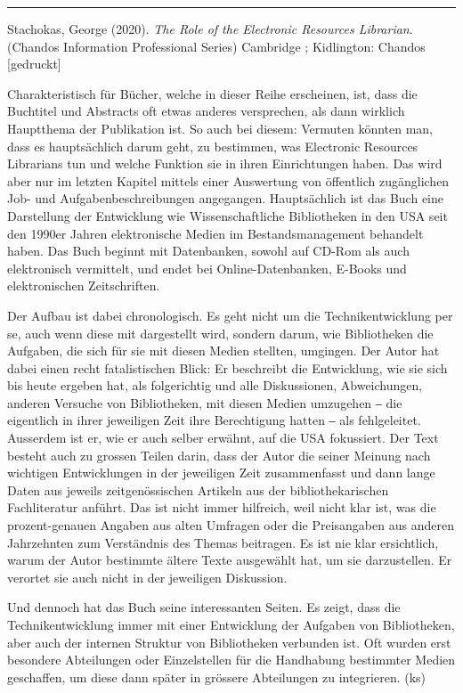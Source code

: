 \documentclass[a4paper,
fontsize=11pt,
oneside,
numbers=noperiodatend,
parskip=half-,
bibliography=totoc,
final
]{scrartcl}
\begin{document}
\begin{center}\rule{0.5\linewidth}{0.5pt}\end{center}

Stachokas, George (2020). \emph{The Role of the Electronic Resources
Librarian}. (Chandos Information Professional Series) Cambridge ;
Kidlington: Chandos {[}gedruckt{]}

Charakteristisch für Bücher, welche in dieser Reihe erscheinen, ist,
dass die Buchtitel und Abstracts oft etwas anderes versprechen, als dann
wirklich Hauptthema der Publikation ist. So auch bei diesem: Vermuten
könnten man, dass es hauptsächlich darum geht, zu bestimmen, was
Electronic Resources Librarians tun und welche Funktion sie in ihren
Einrichtungen haben. Das wird aber nur im letzten Kapitel mittels einer
Auswertung von öffentlich zugänglichen Job- und Aufgabenbeschreibungen
angegangen. Hauptsächlich ist das Buch eine Darstellung der Entwicklung
wie Wissenschaftliche Bibliotheken in den USA seit den 1990er Jahren
elektronische Medien im Bestandsmanagement behandelt haben. Das Buch
beginnt mit Datenbanken, sowohl auf CD-Rom als auch elektronisch
vermittelt, und endet bei Online-Datenbanken, E-Books und elektronischen
Zeitschriften.

Der Aufbau ist dabei chronologisch. Es geht nicht um die
Technikentwicklung per se, auch wenn diese mit dargestellt wird, sondern
darum, wie Bibliotheken die Aufgaben, die sich für sie mit diesen Medien
stellten, umgingen. Der Autor hat dabei einen recht fatalistischen
Blick: Er beschreibt die Entwicklung, wie sie sich bis heute ergeben
hat, als folgerichtig und alle Diskussionen, Abweichungen, anderen
Versuche von Bibliotheken, mit diesen Medien umzugehen ‒ die eigentlich
in ihrer jeweiligen Zeit ihre Berechtigung hatten ‒ als fehlgeleitet.
Ausserdem ist er, wie er auch selber erwähnt, auf die USA fokussiert.
Der Text besteht auch zu grossen Teilen darin, dass der Autor die seiner
Meinung nach wichtigen Entwicklungen in der jeweiligen Zeit
zusammenfasst und dann lange Daten aus jeweils zeitgenössischen Artikeln
aus der bibliothekarischen Fachliteratur anführt. Das ist nicht immer
hilfreich, weil nicht klar ist, was die prozent-genauen Angaben aus
alten Umfragen oder die Preisangaben aus anderen Jahrzehnten zum
Verständnis des Themas beitragen. Es ist nie klar ersichtlich, warum der
Autor bestimmte ältere Texte ausgewählt hat, um sie darzustellen. Er
verortet sie auch nicht in der jeweiligen Diskussion.

Und dennoch hat das Buch seine interessanten Seiten. Es zeigt, dass die
Technikentwicklung immer mit einer Entwicklung der Aufgaben von
Bibliotheken, aber auch der internen Struktur von Bibliotheken verbunden
ist. Oft wurden erst besondere Abteilungen oder Einzelstellen für die
Handhabung bestimmter Medien geschaffen, um diese dann später in
grössere Abteilungen zu integrieren. (ks)
\end{document}
